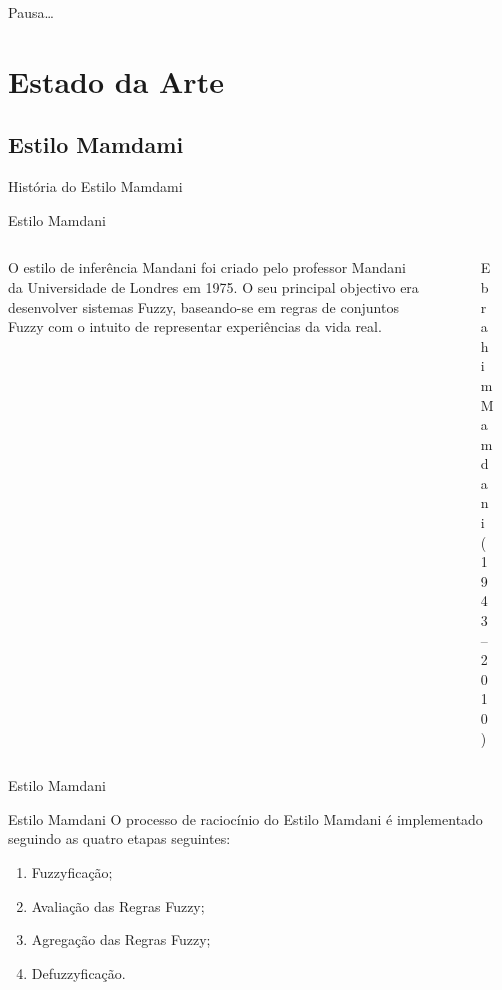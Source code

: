 \documentclass[portuges]{beamer}
\begin{document}
\begin{frame}{Pausa\ldots}
\begin{figure}
			\centering
	\end{figure}		
\end{frame}

\section{Estado da Arte}
\subsection{Estilo Mamdami}

\begin{frame}{História do Estilo Mamdami}
\begin{block}{Estilo Mamdani}
	\begin{columns}	
	\begin{column}{7cm}
	O estilo de inferência Mandani foi criado pelo professor Mandani da Universidade de Londres
	em 1975. O seu principal objectivo era desenvolver sistemas Fuzzy, baseando-se em regras de conjuntos Fuzzy 
	com o intuito de representar experiências da vida real.
	\end{column}
	\begin{column}{3cm}
		\begin{figure}
			\centering
			\caption{Ebrahim Mamdani (1943--2010)}
		\end{figure}		
	\end{column}
	\end{columns}
\end{block}
\end{frame}

\begin{frame}{Estilo Mamdani}
	\begin{definition}{Estilo Mamdani}
		O processo de raciocínio do \alert{Estilo Mamdani} é implementado seguindo as quatro etapas seguintes:
		\begin{enumerate}[<+->]
			\item Fuzzyficação;
			\item Avaliação das Regras Fuzzy;
			\item Agregação das Regras Fuzzy;
			\item Defuzzyficação.
		\end{enumerate}
	\end{definition}
\end{frame}
\end{document}
